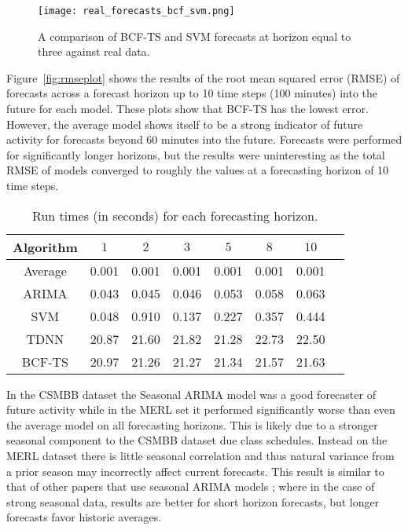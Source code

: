 \begin{figure}[h]
\centering
\texttt{[image: real\_forecasts\_bcf\_svm.png]}
\caption{A comparison of BCF-TS and SVM forecasts at horizon equal to three against real data.}
\label{fig:realbcfsvm}
\end{figure}

Figure~\ref{fig:rmseplot} shows the results of the root mean squared error (RMSE) of forecasts across a forecast horizon up to 10 time steps (100 minutes) into the future for each model.  These plots show that BCF-TS has the lowest error.  However, the average model shows itself to be a strong indicator of future activity for forecasts beyond 60 minutes into the future.  Forecasts were performed for significantly longer horizons, but the results were uninteresting as the total RMSE of models converged to roughly the values at a forecasting horizon of 10 time steps.  

\begin{table}
\centering
\caption{Run times (in seconds) for each forecasting horizon.}
\begin{tabular}{|c|c|c|c|c|c|c|c|} \hline
Algorithm & $1$ & $2$ & $3$ & $5$ & $8$ & $10$ \\ \hline
Average & 0.001 & 0.001 & 0.001 & 0.001 & 0.001 & 0.001 \\ \hline
ARIMA & 0.043 & 0.045 & 0.046 & 0.053 & 0.058 & 0.063\\ \hline
SVM & 0.048 & 0.910 & 0.137 & 0.227 & 0.357 & 0.444 \\ \hline
TDNN & 20.87 & 21.60 & 21.82 & 21.28 & 22.73 & 22.50 \\ \hline
BCF-TS & 20.97 & 21.26 & 21.27 & 21.34 & 21.57 & 21.63\\ \hline
\end{tabular}
\label{fig:runtimestab}
\end{table}

In the CSMBB dataset the Seasonal ARIMA model was a good forecaster of future activity while in the MERL set it performed significantly worse than even the average model on all forecasting horizons.  This is likely due to a stronger seasonal component to the CSMBB dataset due class schedules.  Instead on the MERL dataset there is little seasonal correlation and thus natural variance from a prior season may incorrectly affect current forecasts.  This result is similar to that of other papers that use seasonal ARIMA models \cite{Newsham2010}; where in the case of strong seasonal data, results are better for short horizon forecasts, but longer forecasts favor historic averages.

